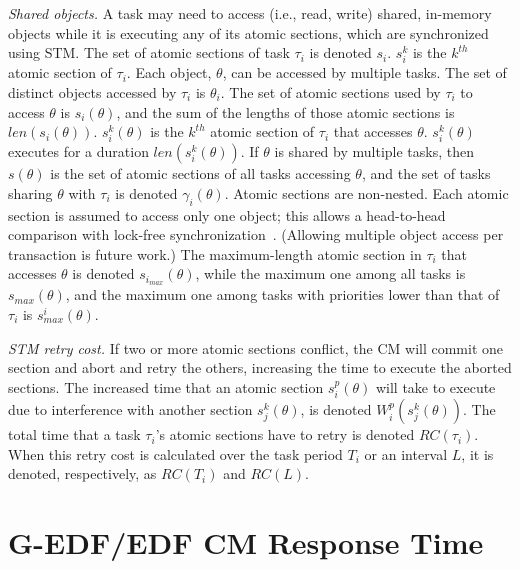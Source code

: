 \documentclass[letter]{sig-alternate}
\begin{document}
\textit{Shared objects.} A task may need to access (i.e., read, write) shared, in-memory objects while it is executing any of its atomic sections, which are synchronized using STM. 
The set of atomic sections of task $\tau_i$ is denoted $s_i$. $s_i^k$ is the $k^{th}$ atomic section of $\tau_i$. 
Each object, $\theta$, can be accessed by multiple tasks. The set of distinct objects accessed by $\tau_i$ is $\theta_i$.
The set of atomic sections used by $\tau_i$ to access $\theta$ is $s_i(\theta)$, and the sum of the lengths of those atomic sections is $len(s_i(\theta))$. $s_i^k(\theta)$ is the $k^{th}$ atomic section of $\tau_i$ that accesses $\theta$. $s_i^k(\theta)$  executes for a duration $len(s_i^k(\theta))$.
If $\theta$ is shared by multiple tasks, then $s(\theta)$ is the set of atomic sections of all tasks accessing $\theta$, and the set of tasks sharing $\theta$ with $\tau_i$ is denoted $\gamma_i(\theta)$. Atomic sections are non-nested. Each atomic section is assumed to access only one object; this allows a head-to-head comparison with lock-free synchronization~\cite{key-5}.  (Allowing multiple object access per transaction is future work.) The maximum-length atomic section in $\tau_i$ that accesses $\theta$ is denoted $s_{i_{max}} (\theta)$, while the maximum one among all tasks is $s_{max} (\theta)$, and the maximum one among tasks with priorities lower than that of $\tau_i$ is $s_{max}^i (\theta)$.

\textit{STM retry cost.} If two or more atomic sections conflict, the CM will commit one section and abort and retry the others, increasing the time to execute the aborted sections. The increased time that an atomic section $s_i^p (\theta)$ will take to execute due to interference with another section $s_j^k (\theta)$, is denoted $W_{i}^{p}(s_{j}^{k}(\theta))$. The total time that a task $\tau_i$'s atomic sections have to retry is denoted $RC(\tau_i)$.
When this retry cost is calculated over the task period $T_i$ or an interval $L$, it is denoted, respectively, as $RC(T_i)$ and $RC(L)$.

\section{G-EDF/EDF CM Response Time}
\label{sec:g-edf-edf-cm}
\end{document}
